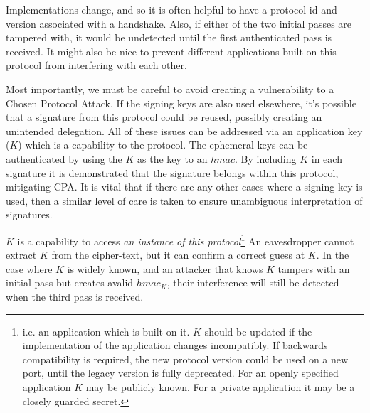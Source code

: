 \documentclass[12pt]{article}
\begin{document}
Implementations change, and so it is often helpful to have a protocol
id and version associated with a handshake.
Also, if either of the two initial passes are tampered with, it would
be undetected until the first authenticated pass is received.
It might also be nice to prevent different applications
built on this protocol from interfering with each other.

Most importantly, we must be careful to avoid creating a vulnerability
to a Chosen Protocol Attack\cite{cpa}. If the signing keys are also used
elsewhere, it's possible that a signature from this protocol could be
reused, possibly creating an unintended delegation.
All of these issues can be addressed via an application key ($K$)
which is a capability to the protocol. The ephemeral keys can be
authenticated by using the $K$ as the key to an $hmac$. By including
$K$ in each signature it is demonstrated that the signature belongs
within this protocol, mitigating CPA. It is vital that if there are any
other cases where a signing key is used, then a similar level of care is
taken to ensure unambiguous interpretation of signatures.

$K$ is a capability to access \emph{an instance of this protocol}\footnote{
  i.e. an application which is built on it.
  $K$ should be updated if the implementation of the application changes
  incompatibly. If backwards compatibility is required, the new protocol
  version could be used on a new port, until the legacy version is fully
  deprecated. For an openly specified application $K$ may be publicly
  known. For a private application it may be a closely guarded secret.
}
An eavesdropper cannot extract $K$ from the cipher-text, but it can
confirm a correct guess at $K$. In the case where $K$ is widely known,
and an attacker that knows $K$ tampers with an initial pass but creates
avalid $hmac_K$, their interference will still be detected when the
third pass is received.
\end{document}
